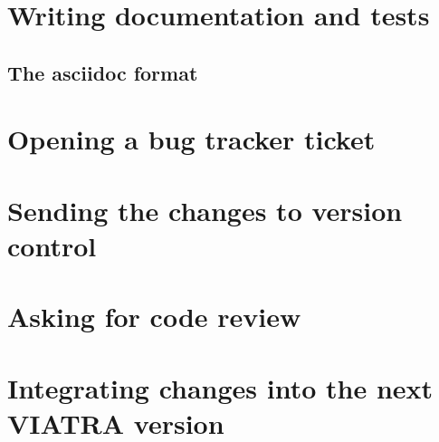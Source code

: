 \documentclass[11pt,a4paper,oneside]{report}
\begin{document}
\section{Writing documentation and tests}
\subsection{The asciidoc format}
\section{Opening a bug tracker ticket}
\section{Sending the changes to version control}
\section{Asking for code review}
\section{Integrating changes into the next VIATRA version}



\nocite{*} %


\label{page:last}
\end{document}
